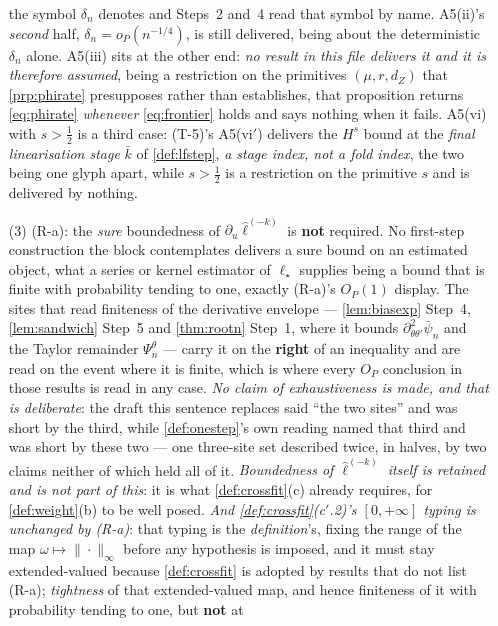 \begin{remark}
\begin{enumerate}
the symbol $\delta_n$ denotes and Steps~2 and~4 read that symbol by name. A5(ii)'s \emph{second} half,
$\delta_n=o_P(n^{-1/4})$, is still delivered, being about the deterministic $\delta_n$ alone.
A5(iii) sits at the
other end: \emph{no result in this file delivers it and it is therefore assumed}, being a restriction on
the primitives $(\mu,r,d_Z)$ that \cref{prp:phirate} presupposes rather than establishes, that
proposition returns \eqref{eq:phirate} \emph{whenever} \eqref{eq:frontier} holds and says nothing when it
fails. A5(vi) with $s>\tfrac12$ is a third case: (T-5)'s A5(vi$'$) delivers the $H^{s}$ bound at the
\emph{final linearisation stage} $\bar k$ of \cref{def:lfstep}, \emph{a stage index, not a fold index},
the two being one glyph apart, while $s>\tfrac12$ is a restriction on the primitive $s$ and is
delivered by nothing.
\item[(3)] \textup{(R-a)}: the \emph{sure} boundedness of $\partial_u\hat\ell^{(-k)}$ is
\textbf{not} required. No first-step construction the block contemplates delivers a sure bound on an
estimated object, what a series or kernel estimator of $\ell_\star$ supplies being a bound that is finite
with probability tending to one, exactly (R-a)'s $O_P(1)$ display. The sites that read finiteness
of the derivative envelope --- \cref{lem:biasexp} Step~4, \cref{lem:sandwich} Step~5 and
\cref{thm:rootn} Step~1, where it bounds $\partial^{2}_{\theta\theta'}\bar\psi_n$ and the Taylor
remainder $\Psi^{\theta}_n$ --- carry it on the
\textbf{right} of an inequality and are read on the event where it is finite, which is where every $O_P$
conclusion in those results is read in any case. \emph{No claim of exhaustiveness is made, and that
is deliberate}: the draft this sentence replaces said ``the two sites'' and was short by the third,
while \cref{def:onestep}'s own reading named that third and was short by these two --- one three-site
set described twice, in halves, by two claims neither of which held all of it. \emph{Boundedness of $\hat\ell^{(-k)}$ itself is
retained and is not part of this}: it is what \cref{def:crossfit}\textup{(c)} already requires, for
\cref{def:weight}(b) to be well posed. \emph{And \cref{def:crossfit}\textup{(c$'$.2)}'s $[0,+\infty]$
typing is unchanged by (R-a)}: that typing is the \emph{definition}'s, fixing the range of the map
$\omega\mapsto\|\cdot\|_\infty$ before any hypothesis is imposed, and it must stay extended-valued because
\cref{def:crossfit} is adopted by results that do not list (R-a); \emph{tightness} of that
extended-valued map, and hence finiteness of it with probability tending to one, but \textbf{not} at

\end{enumerate}
\end{remark}
